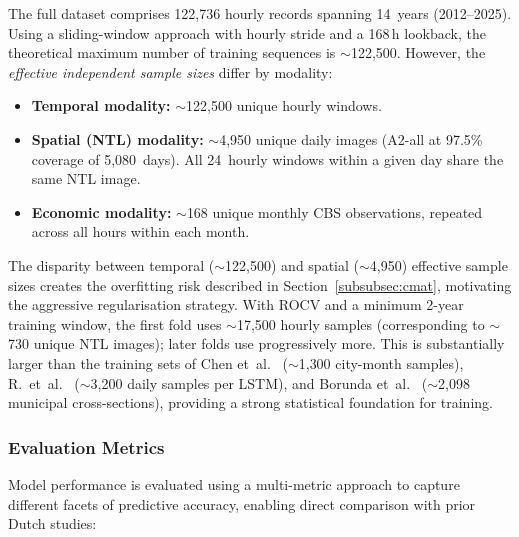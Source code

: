 The full dataset comprises 122{,}736 hourly records spanning 14~years (2012--2025). Using a sliding-window approach with hourly stride and a 168\,h lookback, the theoretical maximum number of training sequences is $\sim$122{,}500. However, the \textit{effective independent sample sizes} differ by modality:

\begin{itemize}
    \item \textbf{Temporal modality:} $\sim$122{,}500 unique hourly windows.
    \item \textbf{Spatial (NTL) modality:} $\sim$4{,}950 unique daily images (A2-all at 97.5\% coverage of 5{,}080~days). All 24~hourly windows within a given day share the same NTL image.
    \item \textbf{Economic modality:} $\sim$168 unique monthly CBS observations, repeated across all hours within each month.
\end{itemize}

The disparity between temporal ($\sim$122{,}500) and spatial ($\sim$4{,}950) effective sample sizes creates the overfitting risk described in Section~\ref{subsubsec:cmat}, motivating the aggressive regularisation strategy. With ROCV and a minimum 2-year training window, the first fold uses $\sim$17{,}500 hourly samples (corresponding to $\sim$730 unique NTL images); later folds use progressively more. This is substantially larger than the training sets of Chen et~al.~\cite{chen_monthly_2025} ($\sim$1{,}300 city-month samples), R.~et~al.~\cite{r_forecasting_2025} ($\sim$3{,}200 daily samples per LSTM), and Borunda et~al.~\cite{borunda_machine_2025} ($\sim$2{,}098 municipal cross-sections), providing a strong statistical foundation for training.

\subsubsection{Evaluation Metrics}
\label{subsubsec:metrics}

Model performance is evaluated using a multi-metric approach to capture different facets of predictive accuracy, enabling direct comparison with prior Dutch studies:

